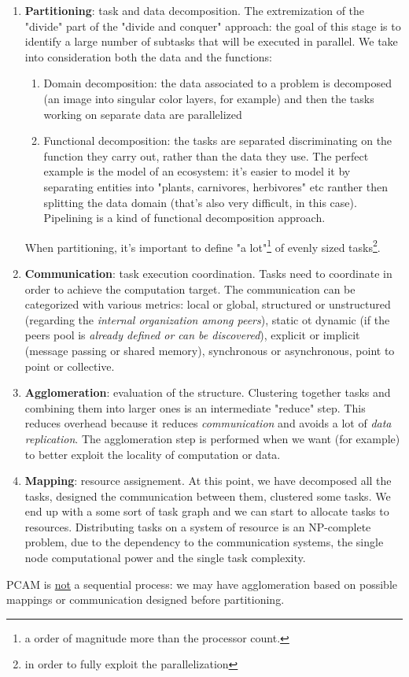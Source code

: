 \documentclass{article}
\begin{document}
			\begin{enumerate}
				\item \textbf{Partitioning}: task and data decomposition. The extremization of the "divide" part of the "divide and conquer" approach: the goal of this stage is to identify a large number of subtasks that will be executed in parallel. We take into consideration both the data and the functions:
					\begin{enumerate}
						\item Domain decomposition: the data associated to a problem is decomposed (an image into singular color layers, for example) and then the tasks working on separate data are parallelized
						\item Functional decomposition: the tasks are separated discriminating on the function they carry out, rather than the data they use. The perfect example is the model of an ecosystem: it's easier to model it by separating entities into "plants, carnivores, herbivores" etc ranther then splitting the data domain (that's also very difficult, in this case). Pipelining is a kind of functional decomposition approach.
					\end{enumerate}
					When partitioning, it's important to define "a lot"\footnote{a order of magnitude more than the processor count.} of evenly sized tasks\footnote{in order to fully exploit the parallelization}.
				\item \textbf{Communication}: task execution coordination. Tasks need to coordinate in order to achieve the computation target. The communication can be categorized with various metrics: local or global, structured or unstructured (regarding the \textit{internal organization among peers}), static ot dynamic (if the peers pool is \textit{already defined or can be discovered}), explicit or implicit (message passing or shared memory), synchronous or asynchronous, point to point or collective.
				\item \textbf{Agglomeration}: evaluation of the structure. Clustering together tasks and combining them into larger ones is an intermediate "reduce" step. This reduces overhead because it reduces \textit{communication} and avoids a lot of \textit{data replication}. The agglomeration step is performed when we want (for example) to better exploit the locality of computation or data.
				\item \textbf{Mapping}: resource assignement. At this point, we have decomposed all the tasks, designed the communication between them, clustered some tasks. We end up with a some sort of task graph and we can start to allocate tasks to resources. Distributing tasks on a system of resource is an NP-complete problem, due to the dependency to the communication systems, the single node computational power and the single task complexity.
			\end{enumerate}
			PCAM is \underline{not} a sequential process: we may have agglomeration based on possible mappings or communication designed before partitioning.
\end{document}
